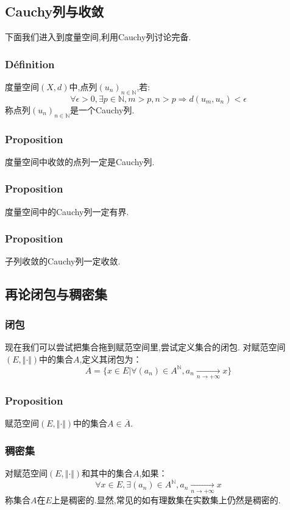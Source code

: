 \documentclass[12pt, a4paper, oneside]{ctexbook}
\begin{document}
  
  \subsection{Cauchy列与收敛}
  下面我们进入到度量空间,利用Cauchy列讨论完备.
  \subsubsection{Définition}
  度量空间$(X,d)$中,点列$(u_n)_{n\in\mathbb{N}}$,若:
  $$
    \forall\epsilon>0, \exists p\in \mathbb{N}, m>p,n>p\Rightarrow d(u_m,u_n)<\epsilon
  $$
  称点列$(u_n)_{n\in\mathbb{N}}$是一个Cauchy列.
  \subsubsection{Proposition}
  度量空间中收敛的点列一定是Cauchy列.
  \subsubsection{Proposition}
  度量空间中的Cauchy列一定有界.
  \subsubsection{Proposition}
  子列收敛的Cauchy列一定收敛.


  \subsection{再论闭包与稠密集}
  \subsubsection{闭包}
  现在我们可以尝试把集合拖到赋范空间里,尝试定义集合的闭包.
  对赋范空间$(E,\Vert \cdot \Vert)$中的集合$A$,定义其闭包为：
  $$
    \overline{A}=\{x\in E | \forall(a_n)\in A^\mathbb{N},a_n\xrightarrow[n\rightarrow+\infty]{}x\}
  $$

  \subsubsection{Proposition}
  赋范空间$(E,\Vert \cdot \Vert)$中的集合$A\in\overline{A}$.
  \subsubsection{稠密集}
  对赋范空间$(E,\Vert \cdot \Vert)$和其中的集合$A$,如果：
  $$
    \forall x\in E, \exists (a_n)\in A^\mathbb{N}, a_n\xrightarrow[n\rightarrow+\infty]{}x
  $$
  称集合$A$在$E$上是稠密的.显然,常见的如有理数集在实数集上仍然是稠密的.
\end{document}
